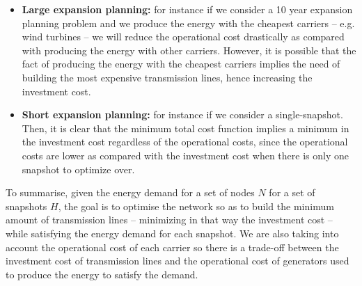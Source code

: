 \begin{itemize}
    \item \textbf{Large expansion planning:} for instance if we consider a 10 year expansion planning problem and we produce the energy with the cheapest carriers -- e.g. wind turbines -- we will reduce the operational cost drastically as compared with producing the energy with other carriers. However, it is possible that the fact of producing the energy with the cheapest carriers implies the need of building the most expensive transmission lines, hence increasing the investment cost.
    \item \textbf{Short expansion planning:} for instance if we consider a single-snapshot.  Then, it is clear that the minimum total cost function implies a minimum in the investment cost regardless of the operational costs, since the operational costs are lower as compared with the investment cost when there is only one snapshot to optimize over.
\end{itemize}
To summarise, given the energy demand for a set of nodes $N$ for a set of snapshots $H$, the goal is to optimise the network so as to build the minimum amount of transmission lines -- minimizing in that way the investment cost -- while satisfying the energy demand for each snapshot. We are also taking into account the operational cost of each carrier so there is a trade-off between the investment cost of transmission lines and the operational cost of generators used to produce the energy to satisfy the demand.
